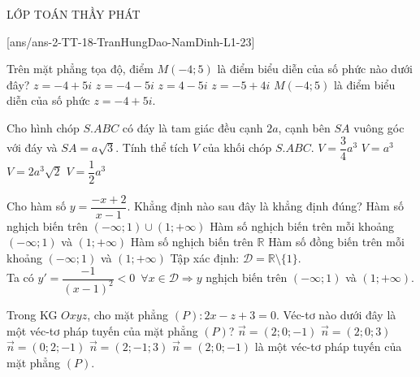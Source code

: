 \begin{name}
	{\tenchude}{\tendethi}{LỚP TOÁN THẦY PHÁT}{\thoigian}
\end{name}
\setcounter{ex}{0}\setcounter{bt}{0}
[ans/ans-2-TT-18-TranHungDao-NamDinh-L1-23]
\begin{ex}%
Trên mặt phẳng tọa độ, điểm $M(-4;5)$ là điểm biểu diễn của số phức nào dưới đây?
\choice 
{\True $z=-4+5i$} 
{$z=-4-5i$}
{$z=4-5i$} 
{$z=-5+4i$}
\loigiai
{
$M(-4;5)$ là điểm biểu diễn của số phức $z=-4+5i$.
}
\end{ex}

\begin{ex}%
Cho hình chóp $S.ABC$ có đáy là tam giác đều cạnh $2a$, cạnh bên $SA$ vuông góc với đáy và $SA=a\sqrt{3}$. Tính thể tích $V$ của khối chóp $S.ABC$.
\choice 
{$V=\dfrac{3}{4}a^3$} 
{\True $V=a^3$}
{$V=2a^3\sqrt{2}$} 
{$V=\dfrac{1}{2}a^3$}
\loigiai
{
}
\end{ex}

\begin{ex}%
Cho hàm số $y=\dfrac{-x+2}{x-1}$. Khẳng định nào sau đây là khẳng định đúng?
\choice 
{Hàm số nghịch biến trên $(-\infty ;1)\cup (1;+\infty )$} 
{\True Hàm số nghịch biến trên mỗi khoảng $(-\infty ;1)$ và $(1;+\infty )$}
{Hàm số nghịch biến trên $\mathbb{R}$} 
{Hàm số đồng biến trên mỗi khoảng $(-\infty ;1)$ và $(1;+\infty )$}
\loigiai
{
Tập xác định: $\mathscr D=\mathbb{R}\setminus\{1\}$.\\
Ta có $y'=\dfrac{-1}{(x-1)^2}<0\,\,\,\forall x\in\mathscr D\Rightarrow y$ nghịch biến trên $(-\infty ;1)$ và $(1;+\infty )$.
}
\end{ex}

\begin{ex}%
Trong KG $Oxyz$, cho mặt phẳng $(P)\colon 2x-z+3=0$. Véc-tơ nào dưới đây là một véc-tơ pháp tuyến của mặt phẳng $(P)$?
\choice 
{\True $\overrightarrow{n}=(2;0;-1)$} 
{$\overrightarrow{n}=(2;0;3)$}
{$\overrightarrow{n}=(0;2;-1)$} 
{$\overrightarrow{n}=(2;-1;3)$}
\loigiai
{
$\overrightarrow{n}=(2;0;-1)$ là một véc-tơ pháp tuyến của mặt phẳng $(P)$.
}
\end{ex}

